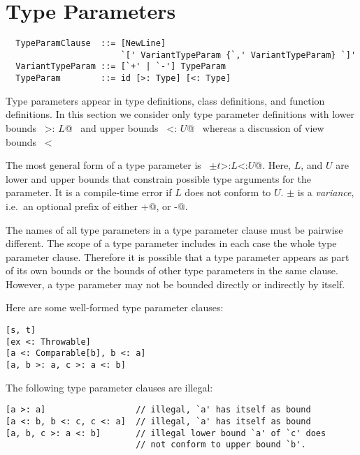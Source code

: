 \section{Type Parameters}\label{sec:type-params}

\syntax\begin{lstlisting}
  TypeParamClause  ::= [NewLine] 
                       `[' VariantTypeParam {`,' VariantTypeParam} `]'
  VariantTypeParam ::= [`+' | `-'] TypeParam
  TypeParam        ::= id [>: Type] [<: Type]
\end{lstlisting}


Type parameters appear in type definitions, class definitions, and
function definitions.  In this section we consider only type parameter
definitions with lower bounds ~\lstinline@>: $L$@~ and upper bounds
~\lstinline@<: $U$@~ whereas a discussion of view bounds
~\lstinline@<% $U$@~ is deferred to Section~\ref{sec:view-bounds}.

The most general form of a type parameter is ~\lstinline@$\pm t$>:$L$<:$U$@.  
Here, $L$, and $U$ are lower and upper bounds that
constrain possible type arguments for the parameter.  It is a
compile-time error if $L$ does not conform to $U$. $\pm$ is a {\em
variance}, i.e.\ an optional prefix of either \lstinline@+@, or
\lstinline@-@.

The names of all type parameters in a type parameter clause must be
pairwise different.  The scope of a type parameter includes in each
case the whole type parameter clause. Therefore it is possible that a
type parameter appears as part of its own bounds or the bounds of
other type parameters in the same clause.  However, a type parameter
may not be bounded directly or indirectly by itself.

\example Here are some well-formed type parameter clauses:
\begin{lstlisting}
[s, t]
[ex <: Throwable]
[a <: Comparable[b], b <: a]
[a, b >: a, c >: a <: b]
\end{lstlisting}
The following type parameter clauses are illegal:
\begin{lstlisting}
[a >: a]                  // illegal, `a' has itself as bound
[a <: b, b <: c, c <: a]  // illegal, `a' has itself as bound
[a, b, c >: a <: b]       // illegal lower bound `a' of `c' does
                          // not conform to upper bound `b'.
\end{lstlisting}

